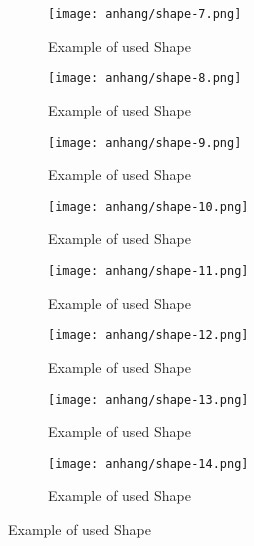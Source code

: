 	\begin{figure}[h]
		\centering
		\begin{subfigure}{0.45\textwidth}
			\centering
			\texttt{[image: anhang/shape-7.png]}
			\caption[Example of used Shape, created by \cite{Quixel}]{Example of used Shape}
		\end{subfigure}
		\begin{subfigure}{0.45\textwidth}
			\centering
			\texttt{[image: anhang/shape-8.png]}
			\caption[Example of used Shape, created by \cite{Quixel}]{Example of used Shape}
		\end{subfigure}
		
		\begin{subfigure}{0.45\textwidth}
			\centering
			\texttt{[image: anhang/shape-9.png]}
			\caption[Example of used Shape, created by \cite{Quixel}]{Example of used Shape}
		\end{subfigure}
		\begin{subfigure}{0.45\textwidth}
			\centering
			\texttt{[image: anhang/shape-10.png]}
			\caption[Example of used Shape, created by \cite{Quixel}]{Example of used Shape}
		\end{subfigure}
		
		\begin{subfigure}{0.45\textwidth}
			\centering
			\texttt{[image: anhang/shape-11.png]}
			\caption[Example of used Shape, created by \cite{Quixel}]{Example of used Shape}
		\end{subfigure}
		\begin{subfigure}{0.45\textwidth}
			\centering
			\texttt{[image: anhang/shape-12.png]}
			\caption[Example of used Shape, created by \cite{Quixel}]{Example of used Shape}
		\end{subfigure}
		
		\begin{subfigure}{0.45\textwidth}
			\centering
			\texttt{[image: anhang/shape-13.png]}
			\caption[Example of used Shape, created by \cite{Quixel}]{Example of used Shape}
		\end{subfigure}
		\begin{subfigure}{0.45\textwidth}
			\centering
			\texttt{[image: anhang/shape-14.png]}
			\caption[Example of used Shape, created by \cite{Quixel}]{Example of used Shape}
		\end{subfigure}
		
	\end{figure}
	
